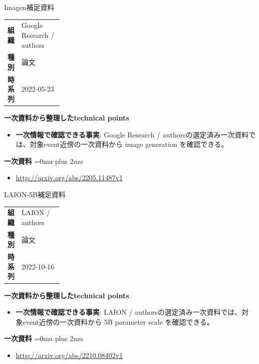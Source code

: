 \begin{technicalnote}{Imagen}{補足資料}
\begingroup
\begin{tabularx}{\linewidth}{@{}>{\bfseries}p{0.22\linewidth}X@{}}
組織 & Google Research / authors \\
種別 & 論文 \\
時系列 & 2022-05-23 \\
\end{tabularx}
\smallskip
{\bfseries 一次資料から整理したtechnical points}
\begin{itemize}[leftmargin=1.5em,itemsep=0.35em]
\item \textbf{一次情報で確認できる事実}: Google Research / authorsの選定済み一次資料では、対象event近傍の一次資料から image generation を確認できる。
\end{itemize}
\begin{minipage}{\linewidth}
\begin{samepage}
{\bfseries 一次資料}
\begingroup\sloppy
\Urlmuskip=0mu plus 2mu\relax
\begin{itemize}[leftmargin=1.5em,itemsep=0.25em]
\item {\scriptsize\url{http://arxiv.org/abs/2205.11487v1}}
\end{itemize}
\endgroup
\end{samepage}
\end{minipage}
\endgroup
\end{technicalnote}
\medskip

\begin{technicalnote}{LAION-5B}{補足資料}
\begingroup
\begin{tabularx}{\linewidth}{@{}>{\bfseries}p{0.22\linewidth}X@{}}
組織 & LAION / authors \\
種別 & 論文 \\
時系列 & 2022-10-16 \\
\end{tabularx}
\smallskip
{\bfseries 一次資料から整理したtechnical points}
\begin{itemize}[leftmargin=1.5em,itemsep=0.35em]
\item \textbf{一次情報で確認できる事実}: LAION / authorsの選定済み一次資料では、対象event近傍の一次資料から 5B parameter scale を確認できる。
\end{itemize}
\begin{minipage}{\linewidth}
\begin{samepage}
{\bfseries 一次資料}
\begingroup\sloppy
\Urlmuskip=0mu plus 2mu\relax
\begin{itemize}[leftmargin=1.5em,itemsep=0.25em]
\item {\scriptsize\url{http://arxiv.org/abs/2210.08402v1}}
\end{itemize}
\endgroup
\end{samepage}
\end{minipage}
\endgroup
\end{technicalnote}
\medskip

